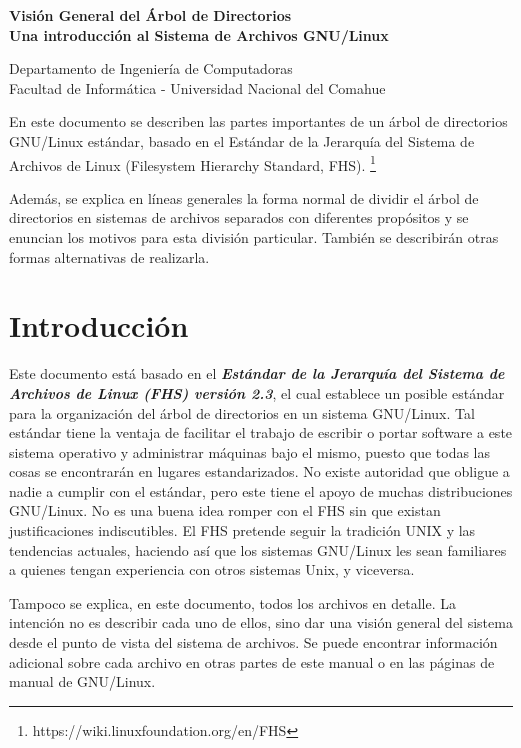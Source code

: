 \documentclass[12pt]{article}
\def\maketitle{

 \makeatletter
 {\color{bl} \centering \huge \sc \textbf{
Visión General del Árbol de Directorios \\
\large \vspace*{-8pt} \color{black} Una introducción al Sistema de Archivos GNU/Linux
 \vspace*{8pt} }\par}
 \makeatother


 \makeatletter
 {\centering \small 
 	Departamento de Ingeniería de Computadoras \\
 	Facultad de Informática - Universidad Nacional del Comahue \\
 	\vspace{20pt} }
 \makeatother

}
\begin{document}
\thispagestyle{empty}
\maketitle
\setlength{\parindent}{0pt}

En este documento se describen las partes importantes de un árbol de
directorios GNU/Linux estándar, basado en el Estándar de la Jerarquía del
Sistema de Archivos de Linux (Filesystem Hierarchy Standard, FHS).
\footnote{https://wiki.linuxfoundation.org/en/FHS} 

Además, se explica en líneas generales la forma normal de dividir el árbol de directorios
en sistemas de archivos separados con diferentes propósitos y se enuncian los
motivos para esta división particular. También se describirán otras formas
alternativas de realizarla.  

\section{ Introducción}
Este documento está basado en el \textbf{\textit{Estándar de la Jerarquía del
Sistema de Archivos de Linux (FHS) versión 2.3}}, el cual 
establece un posible estándar para la organización del árbol de directorios en un
sistema GNU/Linux. Tal estándar tiene la ventaja de facilitar el trabajo de
escribir o portar software a este sistema operativo y administrar máquinas bajo
el mismo, puesto que todas las cosas se encontrarán en lugares estandarizados.
No existe autoridad que obligue a nadie a cumplir con el estándar, pero este
tiene el apoyo de muchas distribuciones GNU/Linux. No es una buena idea romper
con el FHS sin que existan justificaciones indiscutibles. El FHS pretende seguir
la tradición UNIX y las tendencias actuales, haciendo así que los sistemas
GNU/Linux les sean familiares a quienes tengan experiencia con otros sistemas
Unix, y viceversa.  


Tampoco se explica, en este documento, todos los archivos en detalle. La
intención no es describir cada uno de ellos, sino dar una visión general del
sistema desde el punto de vista del sistema de archivos.  Se puede encontrar
información adicional sobre cada archivo en otras partes de este manual o en las
páginas de manual de GNU/Linux.  
\end{document}
